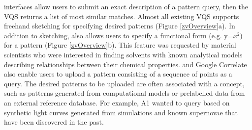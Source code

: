  interfaces allow users to submit an exact description of a pattern query, then the VQS returns a list of most similar matches. Almost all existing VQS supports freehand sketching for specifying desired patterns (Figure \ref{zvOverview}a). In addition to sketching, \zv also allows users to specify a functional form (e.g. y=$x^2$) for a pattern (Figure \ref{zvOverview}b). This feature was requested by material scientists who were interested in finding solvents with known analytical models describing relationships between their chemical properties. \zv and Google Correlate also enable users to upload a pattern consisting of a sequence of points as a query. The desired patterns to be uploaded are often associated with a concept, such as patterns generated from computational models or prelabelled data from an external reference database. For example, A1 wanted to query based on synthetic light curves generated from simulations and known supernovae that have been discovered in the past.
